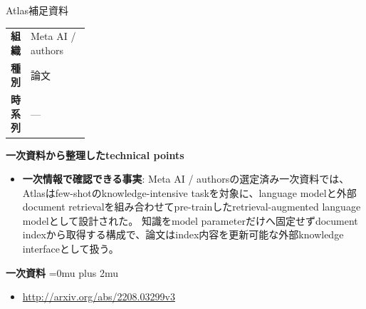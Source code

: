 \begin{technicalnote}{Atlas}{補足資料}
\begingroup
\begin{tabularx}{\linewidth}{@{}>{\bfseries}p{0.22\linewidth}X@{}}
組織 & Meta AI / authors \\
種別 & 論文 \\
時系列 & — \\
\end{tabularx}
\smallskip
{\bfseries 一次資料から整理したtechnical points}
\begin{itemize}[leftmargin=1.5em,itemsep=0.35em]
\item \textbf{一次情報で確認できる事実}: Meta AI / authorsの選定済み一次資料では、Atlasはfew-shotのknowledge-intensive taskを対象に、language modelと外部document retrievalを組み合わせてpre-trainしたretrieval-augmented language modelとして設計された。 知識をmodel parameterだけへ固定せずdocument indexから取得する構成で、論文はindex内容を更新可能な外部knowledge interfaceとして扱う。
\end{itemize}
\begin{minipage}{\linewidth}
\begin{samepage}
{\bfseries 一次資料}
\begingroup\sloppy
\Urlmuskip=0mu plus 2mu\relax
\begin{itemize}[leftmargin=1.5em,itemsep=0.25em]
\item {\scriptsize\url{http://arxiv.org/abs/2208.03299v3}}
\end{itemize}
\endgroup
\end{samepage}
\end{minipage}
\endgroup
\end{technicalnote}
\medskip
